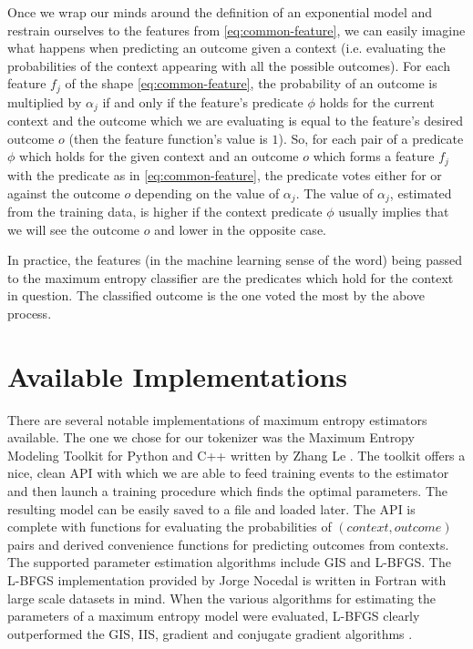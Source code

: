 Once we wrap our minds around the definition of an exponential model and
restrain ourselves to the features from \ref{eq:common-feature}, we can easily
imagine what happens when predicting an outcome given a context (i.e.
evaluating the probabilities of the context appearing with all the possible
outcomes). For each feature $f_j$ of the shape \ref{eq:common-feature}, the
probability of an outcome is multiplied by $\alpha_j$ if and only if the
feature's predicate $\phi$ holds for the current context and the outcome which
we are evaluating is equal to the feature's desired outcome $o$ (then the
feature function's value is $1$). So, for each pair of a predicate $\phi$ which
holds for the given context and an outcome $o$ which forms a feature $f_j$ with
the predicate as in \ref{eq:common-feature}, the predicate votes either for or
against the outcome $o$ depending on the value of $\alpha_j$. The value of
$\alpha_j$, estimated from the training data, is higher if the context
predicate $\phi$ usually implies that we will see the outcome $o$ and lower in
the opposite case.

In practice, the features (in the machine learning sense of the word) being
passed to the maximum entropy classifier are the predicates which hold for the
context in question. The classified outcome is the one voted the most by the
above process.

\section{Available Implementations}
\label{sec:maxent-impl}

There are several notable implementations of maximum entropy estimators
available. The one we chose for our tokenizer was the Maximum Entropy Modeling
Toolkit for Python and C++ written by Zhang Le \cite{maxent-toolkit}. The
toolkit offers a nice, clean API with which we are able to feed training events
to the estimator and then launch a training procedure which finds the optimal
parameters. The resulting model can be easily saved to a file and loaded later.
The API is complete with functions for evaluating the probabilities of
$(context, outcome)$ pairs and derived convenience functions for predicting
outcomes from contexts. The supported parameter estimation algorithms include
GIS and L-BFGS. The L-BFGS implementation provided by Jorge Nocedal is written
in Fortran with large scale datasets in mind. When the various algorithms for
estimating the parameters of a maximum entropy model were evaluated, L-BFGS
clearly outperformed the GIS, IIS, gradient and conjugate gradient algorithms
\cite{maxent-algorithms}.

